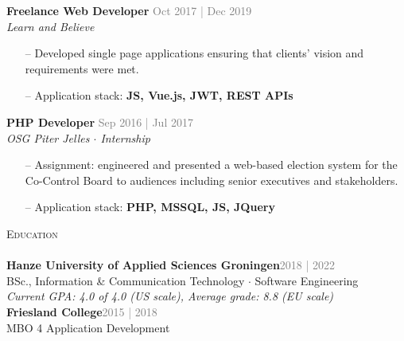 \documentclass[a4paper]{article}
\newcommand{\lineunder} {
    \vspace*{-8pt} \\
    \hspace*{-18pt} \hrulefill \\
}
\newcommand{\header} [1] {
    {\hspace*{-18pt}\vspace*{6pt} \textsc{#1}}
    \vspace*{-6pt} \lineunder
}
\begin{document}

\textbf{Freelance Web Developer} \hfill \textcolor{gray}{Oct 2017 | Dec 2019}\\
\textit{Learn and Believe}\\
\vspace{-1mm}
\begin{itemize} \itemsep 1pt
	\item[--] Developed single page applications ensuring that clients’ vision and requirements were met.
	\item[--] Application stack: \textbf{JS, Vue.js, JWT, REST APIs}
\end{itemize}


\textbf{PHP Developer} \hfill \textcolor{gray}{Sep 2016 | Jul 2017}\\
\textit{OSG Piter Jelles $\cdot$ Internship}\\
\vspace{-1mm}
\begin{itemize} \itemsep 1pt
	\item[--] Assignment: engineered and presented a web-based election system for the Co-Control Board to audiences including senior executives and stakeholders.
	\item[--] Application stack: \textbf{PHP, MSSQL, JS, JQuery}
\end{itemize}


\vspace{5mm}

\header{Education}
\vspace{2mm}
\textbf{Hanze University of Applied Sciences Groningen}\hfill \textcolor{gray}{2018 | 2022}\\
BSc., Information \& Communication Technology $\cdot$ Software Engineering\\
\vspace{1mm}
\emph{Current GPA: 4.0 of 4.0 (US scale), Average grade: 8.8 (EU scale)}\\
\vspace{1mm}
\vspace{3mm}
\textbf{Friesland College}\hfill \textcolor{gray}{2015 | 2018}\\
MBO 4 Application Development\\

\newpage
\end{document}
